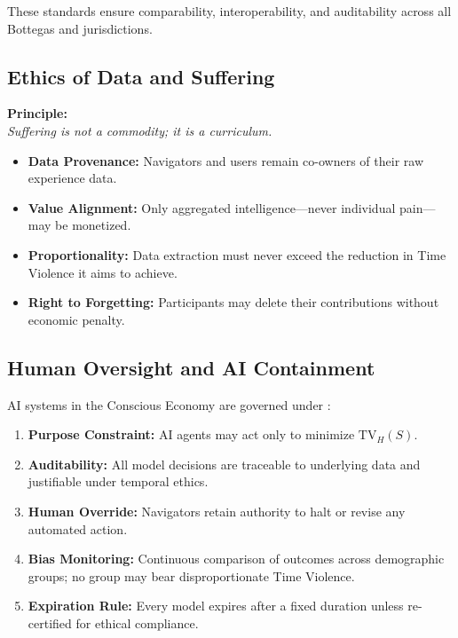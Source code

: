 These standards ensure comparability, interoperability, and auditability across all Bottegas and jurisdictions.

\subsection{Ethics of Data and Suffering}
\label{sec:ethics-data}

\begin{ethicalprinciple}
\textbf{Principle:}\\
\textit{Suffering is not a commodity; it is a curriculum.}
\end{ethicalprinciple}

\begin{itemize}
    \item \textbf{Data Provenance:} Navigators and users remain co-owners of their raw experience data.
    \item \textbf{Value Alignment:} Only aggregated intelligence—never individual pain—may be monetized.
    \item \textbf{Proportionality:} Data extraction must never exceed the reduction in Time Violence it aims to achieve.
    \item \textbf{Right to Forgetting:} Participants may delete their contributions without economic penalty.
\end{itemize}

\subsection{Human Oversight and AI Containment}
\label{sec:ai-containment}

AI systems in the Conscious Economy are governed under :

\begin{enumerate}
    \item \textbf{Purpose Constraint:} AI agents may act only to minimize $\text{TV}_H(S)$.
    \item \textbf{Auditability:} All model decisions are traceable to underlying data and justifiable under temporal ethics.
    \item \textbf{Human Override:} Navigators retain authority to halt or revise any automated action.
    \item \textbf{Bias Monitoring:} Continuous comparison of outcomes across demographic groups; no group may bear disproportionate Time Violence.
    \item \textbf{Expiration Rule:} Every model expires after a fixed duration unless re-certified for ethical compliance.
\end{enumerate}

